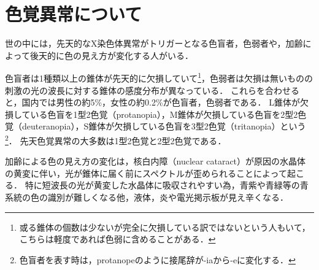 \documentclass[uplatex,paper=a4,fontsize=4.0truemm,jafontsize=4.0truemm,head_space=30.0truemm,foot_space=30.0truemm,baselineskip=8.0truemm,line_length=40zw,gutter=25.0truemm,oneside,openany,fleqn,hanging_panctuation,open_bracket_pos=nibu_tentsuki,dvipdfmx,jis2004,book,titlepage]{jlreq}
\theoremstyle{mystyle}
\begin{document}
		\section{色覚異常について}
			世の中には，先天的なX染色体異常がトリガーとなる色盲者\cite{Okabe2002a}，色弱者\cite{Sunaga2017}や，加齢によって後天的に色の見え方が変化する人\cite{Kuriki2000}がいる．

			色盲者は1種類以上の錐体が先天的に欠損していて\footnote{或る錐体の個数は少ないが完全に欠損している訳ではないという人もいて，こちらは軽度であれば色弱に含めることがある．}，色弱者は欠損は無いものの刺激の光の波長に対する錐体の感度分布が異なっている．
			これらを合わせると，国内では男性の約5\%，女性の約0.2\%が色盲者，色弱者である\cite[p.~4]{doctors2019}．
			L錐体が欠損している色盲を1型2色覚（protanopia），M錐体が欠損している色盲を2型2色覚（deuteranopia），S錐体が欠損している色盲を3型2色覚（tritanopia）という\footnote{色盲者を表す時は，protanopeのように接尾辞が-iaから-eに変化する．}．
			先天色覚異常の大多数は1型2色覚と2型2色覚である\cite[p.~9]{doctors2014}．

			加齢による色の見え方の変化は，核白内障（nuclear cataract）が原因の水晶体の黄変に伴い，光が錐体に届く前にスペクトルが歪められることによって起こる．
			特に短波長の光が黄変した水晶体に吸収されやすい為，青紫や青緑等の青系統の色の識別が難しくなる他，液体，炎や電光掲示板が見え辛くなる\cite{Ishihara1998}．
\end{document}
